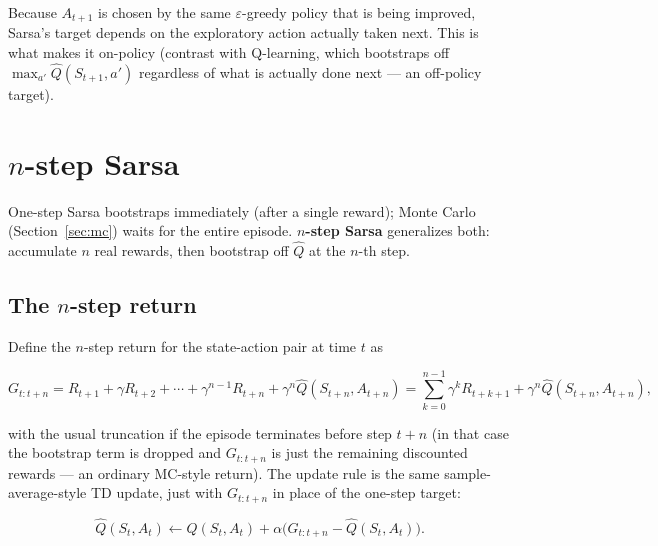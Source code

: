 \documentclass[11pt]{article}
\begin{document}
Because $A_{t+1}$ is chosen by the same $\varepsilon$-greedy policy that is
being improved, Sarsa's target depends on the exploratory action actually
taken next. This is what makes it on-policy (contrast with Q-learning,
which bootstraps off $\max_{a'} \hat{Q}(S_{t+1}, a')$ regardless of what is
actually done next — an off-policy target).

\section{$n$-step Sarsa}

One-step Sarsa bootstraps immediately (after a single reward); Monte Carlo
(Section~\ref{sec:mc}) waits for the entire episode. \textbf{$n$-step
Sarsa} generalizes both: accumulate $n$ real rewards, then bootstrap off
$\hat{Q}$ at the $n$-th step.

\subsection{The $n$-step return}

Define the $n$-step return for the state-action pair at time $t$ as

\[
    G_{t:t+n} = R_{t+1} + \gamma R_{t+2} + \cdots + \gamma^{n-1} R_{t+n} + \gamma^n \hat{Q}(S_{t+n}, A_{t+n})
    = \sum_{k=0}^{n-1} \gamma^k R_{t+k+1} + \gamma^n \hat{Q}(S_{t+n}, A_{t+n}),
\]

with the usual truncation if the episode terminates before step $t+n$ (in
that case the bootstrap term is dropped and $G_{t:t+n}$ is just the
remaining discounted rewards — an ordinary MC-style return). The update
rule is the same sample-average-style TD update, just with $G_{t:t+n}$ in
place of the one-step target:

\[
    \hat{Q}(S_t, A_t) \leftarrow \hat{Q}(S_t, A_t) + \alpha \Big( G_{t:t+n} - \hat{Q}(S_t, A_t) \Big).
\]
\end{document}
